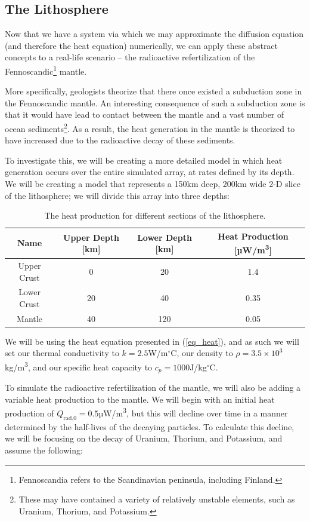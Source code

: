 \documentclass[a4paper,10pt,english]{article}
\begin{document}
\subsection*{The Lithosphere}

Now that we have a system via which we may approximate the diffusion equation (and therefore the heat equation) numerically, we can apply these abstract concepts to a real-life scenario – the radioactive refertilization of the Fennoscandic\footnote{Fennoscandia refers to the Scandinavian peninsula, including Finland.} mantle.

More specifically, geologists theorize that there once existed a subduction zone in the Fennoscandic mantle.  An interesting consequence of such a subduction zone is that it would have lead to contact between the mantle and a vast number of ocean sediments\footnote{These may have contained a variety of relatively unstable elements, such as Uranium, Thorium, and Potassium.}.  As a result, the heat generation in the mantle is theorized to have increased due to the radioactive decay of these sediments.

To investigate this, we will be creating a more detailed model in which heat generation occurs over the entire simulated array, at rates defined by its depth.  We will be creating a model that represents a 150km deep, 200km wide 2-D slice of the lithosphere; we will divide this array into three depths: 

\begin{table}[H]
\center
\begin{tabular}{|c|ccc|}
\hline
Name & Upper Depth [km] & Lower Depth [km] & Heat Production [µW/m\textsuperscript{3}] \\
\hline
Upper Crust & 0 & 20 & 1.4 \\
Lower Crust & 20 & 40 & 0.35 \\
Mantle & 40 & 120 & 0.05 \\
\hline
\end{tabular}
\caption{The heat production for different sections of the lithosphere. \label{table_1}}
\end{table}

We will be using the heat equation presented in (\ref{eq_heat}), and as such we will set our thermal conductivity to $k = 2.5$W/m$^\circ$C, our density to $\rho = 3.5 \times 10^3$ kg/m\textsuperscript{3}, and our specific heat capacity to $c_p = 1000$J/kg$^\circ$C.

To simulate the radioactive refertilization of the mantle, we will also be adding a variable heat production to the mantle.  We will begin with an initial heat production of $Q_\text{rad,0} = 0.5$µW/m\textsuperscript{3}, but this will decline over time in a manner determined by the half-lives of the decaying particles.  To calculate this decline, we will be focusing on the decay of Uranium, Thorium, and Potassium, and assume the following:
\end{document}
